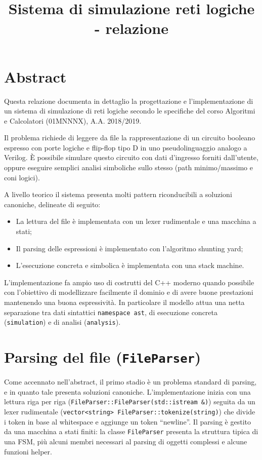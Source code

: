 \documentclass[12pt]{article}
\begin{document}
\title{Sistema di simulazione reti logiche - relazione}
\maketitle

\section{Abstract}

Questa relazione documenta in dettaglio la progettazione e
l'implementazione di un sistema di simulazione di reti logiche secondo
le specifiche del corso Algoritmi e Calcolatori (01MNNNX), A.A.
2018/2019.

Il problema richiede di leggere da file la rappresentazione di un
circuito booleano espresso con porte logiche e flip-flop tipo D in uno
pseudolinguaggio analogo a Verilog. È possibile simulare questo circuito
con dati d'ingresso forniti dall'utente, oppure eseguire semplici
analisi simboliche sullo stesso (path minimo/massimo e coni logici).

A livello teorico il sistema presenta molti pattern riconducibili a
soluzioni canoniche, delineate di seguito:

\begin{itemize}
\item
  La lettura del file è implementata con un lexer rudimentale e una
  macchina a stati;
\item
  Il parsing delle espressioni è implementato con l'algoritmo shunting
  yard;
\item
  L'esecuzione concreta e simbolica è implementata con una stack
  machine.
\end{itemize}

L'implementazione fa ampio uso di costrutti del C++ moderno quando
possibile con l'obiettivo di modellizzare facilmente il dominio e di
avere buone prestazioni mantenendo una buona espressività. In
particolare il modello attua una netta separazione tra dati sintattici
\texttt{namespace\ ast}, di esecuzione concreta (\texttt{simulation}) e
di analisi (\texttt{analysis}).

\section{Parsing del file (\texttt{FileParser})}

Come accennato nell'abstract, il primo stadio è un problema standard di
parsing, e in quanto tale presenta soluzioni canoniche.
L'implementazione inizia con una lettura riga per riga
(\texttt{FileParser::FileParser(std::istream\ \&)}) seguita da un lexer
rudimentale
(\texttt{vector\textless{}string\textgreater{}\ FileParser::tokenize(string)})
che divide i token in base al whitespace e aggiunge un token
``newline''. Il parsing è gestito da una macchina a stati finiti: la
classe \texttt{FileParser} presenta la struttura tipica di una FSM, più
alcuni membri necessari al parsing di oggetti complessi e alcune
funzioni helper.
\end{document}
